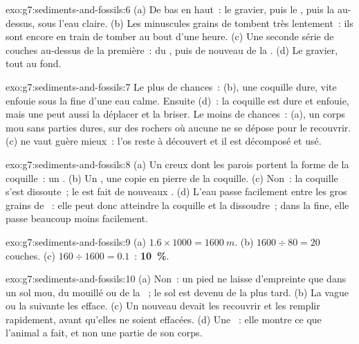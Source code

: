 \begin{solution}{exo:g7:sediments-and-fossils:6}
(a) De bas en haut~: le gravier, puis le , puis la  au-dessus,
sous l'eau claire. (b) Les minuscules grains de  tombent très
lentement~: ils sont encore en train de tomber au bout d'une heure. (c) Une
seconde série de couches au-dessus de la première~: du , puis de
nouveau de la . (d) Le gravier, tout au fond.
\end{solution}

\begin{solution}{exo:g7:sediments-and-fossils:7}
Le plus de chances~: (b), une coquille dure, vite enfouie sous la 
fine d'une eau calme. Ensuite (d)~: la coquille est dure et enfouie, mais
une  peut aussi la déplacer et la briser. Le moins de chances~: (a),
un corps mou sans parties dures, sur des rochers où aucune  ne se
dépose pour le recouvrir. (c) ne vaut guère mieux~: l'os reste à découvert
et il est décomposé et usé.
\end{solution}

\begin{solution}{exo:g7:sediments-and-fossils:8}
(a) Un creux dont les parois portent la forme de la coquille~: un .
(b) Un , une copie en pierre de la coquille. (c) Non~: la coquille
s'est dissoute~; le  est fait de nouveaux . (d) L'eau passe
facilement entre les gros grains de ~: elle peut donc atteindre la
coquille et la dissoudre~; dans la  fine, elle passe beaucoup moins
facilement.
\end{solution}

\begin{solution}{exo:g7:sediments-and-fossils:9}
(a) $1.6 \times 1000 = \qty{1600}{m}$. (b) $1600 \div 80 = 20$ couches.
(c) $160 \div 1600 = 0.1$~: \textbf{10~\%}.
\end{solution}

\begin{solution}{exo:g7:sediments-and-fossils:10}
(a) Non~: un pied ne laisse d'empreinte que dans un sol mou, du 
mouillé ou de la ~; le sol est devenu de la  plus tard. (b) La
vague ou la  suivante les efface. (c) Un nouveau  devait les
recouvrir et les remplir rapidement, avant qu'elles ne soient effacées.
(d) Une ~: elle montre ce que l'animal a fait, et non une
partie de son corps.
\end{solution}

